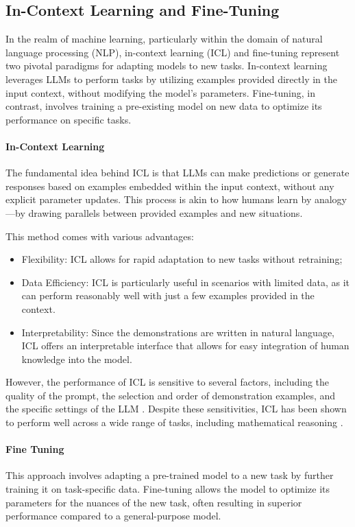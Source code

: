 \subsection{In-Context Learning and Fine-Tuning}
\label{in-context-learning}
In the realm of machine learning, particularly within the domain of natural language processing (NLP), in-context learning (ICL) and fine-tuning represent two pivotal paradigms for adapting models to new tasks. In-context learning leverages LLMs to perform tasks by utilizing examples provided directly in the input context, without modifying the model's parameters. Fine-tuning, in contrast, involves training a pre-existing model on new data to optimize its performance on specific tasks.

\paragraph{In-Context Learning}
The fundamental idea behind ICL is that LLMs can make predictions or generate responses based on examples embedded within the input context, without any explicit parameter updates. This process is akin to how humans learn by analogy—by drawing parallels between provided examples and new situations.

This method comes with various advantages:
\begin{itemize}
    \item Flexibility: ICL allows for rapid adaptation to new tasks without retraining;
    \item Data Efficiency: ICL is particularly useful in scenarios with limited data, as it can perform reasonably well with just a few examples provided in the context.
    \item Interpretability: Since the demonstrations are written in natural language, ICL offers an interpretable interface that allows for easy integration of human knowledge into the model.
\end{itemize}

However, the performance of ICL is sensitive to several factors, including the quality of the prompt, the selection and order of demonstration examples, and the specific settings of the LLM \cite{dong2024surveyincontextlearning}. Despite these sensitivities, ICL has been shown to perform well across a wide range of tasks, including mathematical reasoning \cite{yang2023leandojotheoremprovingretrievalaugmented}.

\paragraph{Fine Tuning} This approach involves adapting a pre-trained model to a new task by further training it on task-specific data. Fine-tuning allows the model to optimize its parameters for the nuances of the new task, often resulting in superior performance compared to a general-purpose model.

